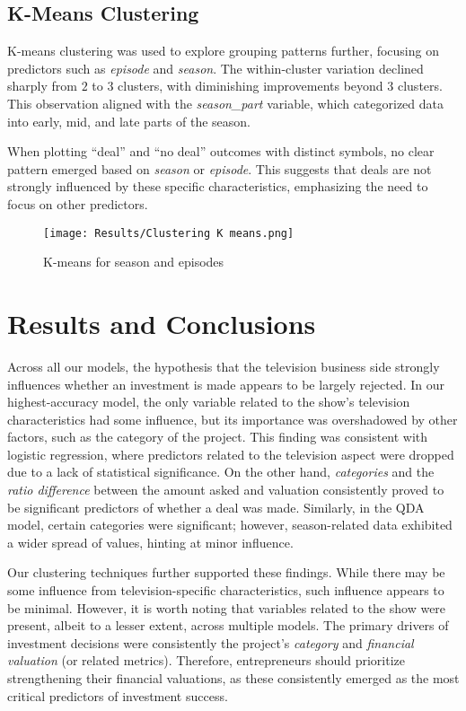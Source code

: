 \documentclass{article}
\begin{document}
\subsection{K-Means Clustering}

K-means clustering was used to explore grouping patterns further, focusing on predictors such as \textit{episode} and \textit{season}. The within-cluster variation declined sharply from $2$ to $3$ clusters, with diminishing improvements beyond $3$ clusters. This observation aligned with the \textit{season\_part} variable, which categorized data into early, mid, and late parts of the season.

When plotting ``deal'' and ``no deal'' outcomes with distinct symbols, no clear pattern emerged based on \textit{season} or \textit{episode}. This suggests that deals are not strongly influenced by these specific characteristics, emphasizing the need to focus on other predictors.

\begin{figure}[H]
    \centering
    \texttt{[image: Results/Clustering K means.png]} %
    \caption{K-means for season and episodes}
    \label{fig:pca_clusters}
\end{figure}


\section{Results and Conclusions}

Across all our models, the hypothesis that the television business side strongly influences whether an investment is made appears to be largely rejected. In our highest-accuracy model, the only variable related to the show’s television characteristics had some influence, but its importance was overshadowed by other factors, such as the category of the project. This finding was consistent with logistic regression, where predictors related to the television aspect were dropped due to a lack of statistical significance. On the other hand, \textit{categories} and the \textit{ratio difference} between the amount asked and valuation consistently proved to be significant predictors of whether a deal was made. Similarly, in the QDA model, certain categories were significant; however, season-related data exhibited a wider spread of values, hinting at minor influence.

Our clustering techniques further supported these findings. While there may be some influence from television-specific characteristics, such influence appears to be minimal. However, it is worth noting that variables related to the show were present, albeit to a lesser extent, across multiple models. The primary drivers of investment decisions were consistently the project’s \textit{category} and \textit{financial valuation} (or related metrics). Therefore, entrepreneurs should prioritize strengthening their financial valuations, as these consistently emerged as the most critical predictors of investment success.
\end{document}
